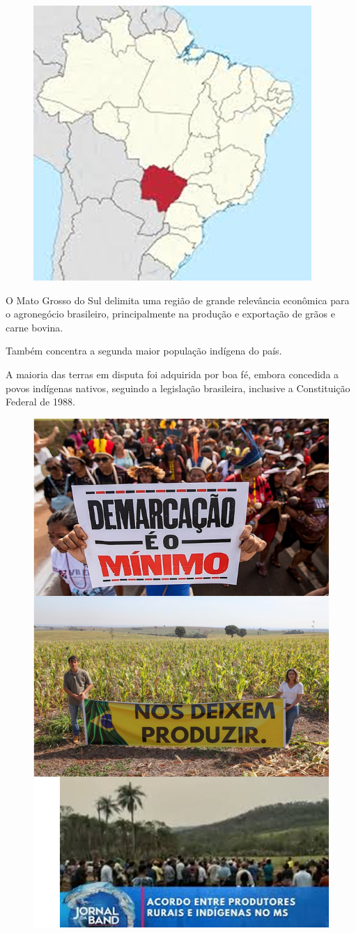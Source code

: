 \documentclass[a4paper,12pt]{article}[abntex2]
\begin{document}
\begin{figure}[H]
    \centering
    \includegraphics[width=0.5\linewidth]{Imagens/a4i3.png}
\end{figure}

O Mato Grosso do Sul delimita uma região de grande relevância econômica para o agronegócio brasileiro, principalmente na produção e exportação de grãos e carne bovina.

Também concentra a segunda maior população indígena do país.

A maioria das terras em disputa foi adquirida por boa fé, embora concedida a povos indígenas nativos, seguindo a legislação brasileira, inclusive a Constituição Federal de 1988.

\begin{figure}[H]
    \centering
    \includegraphics[width=0.5\linewidth]{Imagens/a4i4.png}
\end{figure}
\end{document}
